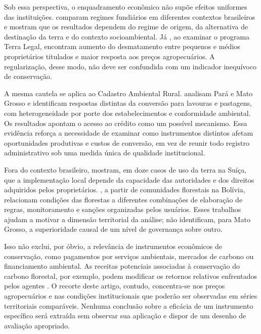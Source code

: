 Sob essa perspectiva, o enquadramento econômico não supõe efeitos uniformes das instituições.  comparam regimes fundiários em diferentes contextos brasileiros e mostram que os resultados dependem do regime de origem, da alternativa de destinação da terra e do contexto socioambiental. Já , ao examinar o programa Terra Legal, encontram aumento do desmatamento entre pequenos e médios proprietários titulados e maior resposta aos preços agropecuários. A regularização, desse modo, não deve ser confundida com um indicador inequívoco de conservação.

A mesma cautela se aplica ao Cadastro Ambiental Rural.  analisam Pará e Mato Grosso e identificam respostas distintas da conversão para lavouras e pastagens, com heterogeneidade por porte dos estabelecimentos e conformidade ambiental. Os resultados apontam o acesso ao crédito como um possível mecanismo. Essa evidência reforça a necessidade de examinar como instrumentos distintos afetam oportunidades produtivas e custos de conversão, em vez de reunir todo registro administrativo sob uma medida única de qualidade institucional.

Fora do contexto brasileiro,  mostram, em doze casos de uso da terra na Suíça, que a implementação local depende da capacidade das autoridades e dos direitos adquiridos pelos proprietários. , a partir de comunidades florestais na Bolívia, relacionam condições das florestas a diferentes combinações de elaboração de regras, monitoramento e sanções organizadas pelos usuários. Esses trabalhos ajudam a motivar a dimensão territorial da análise; não identificam, para Mato Grosso, a superioridade causal de um nível de governança sobre outro.

Isso não exclui, por óbvio, a relevância de instrumentos econômicos de conservação, como pagamentos por serviços ambientais, mercados de carbono ou financiamento ambiental. As receitas potenciais associadas à conservação do carbono florestal, por exemplo, podem modificar os retornos relativos enfrentados pelos agentes \cite{Angelsen2010,SticklerEtAl2013}. O recorte deste artigo, contudo, concentra-se nos preços agropecuários e nas condições institucionais que poderão ser observadas em séries territoriais comparáveis. Nenhuma conclusão sobre a eficácia de um instrumento específico será extraída sem observar sua aplicação e dispor de um desenho de avaliação apropriado.


